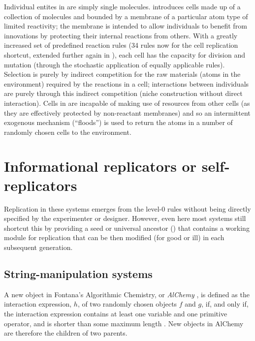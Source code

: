 Individual entites in \textcite{Hutton2002} are simply single molecules. \Textcite{Hutton2007} introduces cells made up of a collection of molecules and bounded by a membrane of a particular atom type of limited reactivity; the membrane is intended to allow individuals to benefit from innovations by protecting their internal reactions from others. With a greatly increased set of predefined reaction rules (34 rules now for the cell replication shortcut, extended further again in \textcite{Lucht2012}), each cell has the capacity for division and mutation (through the stochastic application of equally applicable rules).  Selection is purely by indirect competition for the raw materials (atoms in the environment) required by the reactions in a cell; interactions between individuals are purely through this indirect competition (niche construction without direct interaction). Cells in \textcite{Hutton2007} are incapable of making use of resources from other cells (as they are effectively protected by non-reactant membranes) and so an intermittent exogenous mechanism (``floods'') is used to return the atoms in a number of randomly chosen cells to the environment.

\section{Informational replicators or self-replicators}
\begin{DRAFT}
Replication in these systems emerges from the level-0 rules without being directly specified by the experimenter or designer. However, even here most systems still shortcut this by providing a seed or universal ancestor (\eg \textcite{Ofria2004}) that contains a working module for replication that can be then modified (for good or ill) in each subsequent generation.
\end{DRAFT}
\subsection{String-manipulation systems}

A new object in Fontana's Algorithmic Chemistry, or \emph{AlChemy} \parencite{Fontana1992}, is defined as the interaction expression, $h$, of two randomly chosen objects $f$ and $g$, if, and only if, the interaction expression contains at least one variable and one primitive operator, and is shorter than some maximum length \parencite[p.173--p.180]{Fontana1992}. New objects in AlChemy are therefore the children of two parents.


